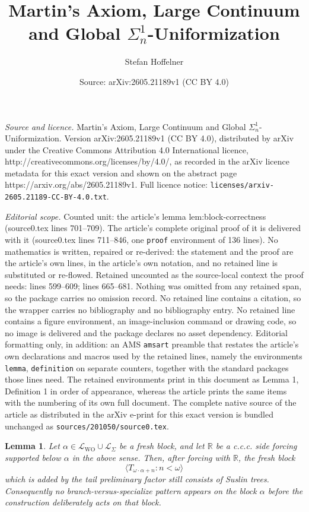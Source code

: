 \documentclass[10pt,a4paper]{amsart}
\title{Martin's Axiom, Large Continuum and Global $\Sigma^1_n$-Uniformization}
\author{Stefan Hoffelner}
\date{Source: arXiv:2605.21189v1 (CC BY 4.0)}
\newtheorem{lemma}{Lemma}
\begin{document}
\maketitle

\noindent\emph{Source and licence.} Martin's Axiom, Large Continuum and Global $\Sigma^1_n$-Uniformization. Version arXiv:2605.21189v1 (CC BY 4.0), distributed by arXiv under the Creative Commons Attribution 4.0 International licence, http://creativecommons.org/licenses/by/4.0/, as recorded in the arXiv licence metadata for this exact version and shown on the abstract page https://arxiv.org/abs/2605.21189v1. Full licence notice: \texttt{licenses/arxiv-2605.21189-CC-BY-4.0.txt}.\par\smallskip

\noindent\textit{Editorial scope.} Counted unit: the article's lemma lem:block-correctness (source0.tex lines 701--709). The article's complete original proof of it is delivered with it (source0.tex lines 711--846, one \texttt{proof} environment of 136 lines). No mathematics is written, repaired or re-derived: the statement and the proof are the article's own lines, in the article's own notation, and no retained line is substituted or re-flowed.  Retained uncounted as the source-local context the proof needs: lines 599--609; lines 665--681.  Nothing was omitted from any retained span, so the package carries no omission record.  No retained line contains a citation, so the wrapper carries no bibliography and no bibliography entry.  No retained line contains a figure environment, an image-inclusion command or drawing code, so no image is delivered and the package declares no asset dependency.  Editorial formatting only, in addition: an AMS \texttt{amsart} preamble that restates the article's own declarations and macros used by the retained lines, namely the environments \texttt{lemma}, \texttt{definition} on separate counters, together with the standard packages those lines need.  The retained environments print in this document as Lemma 1, Definition 1 in order of appearance, whereas the article prints the same items with the numbering of its own full document.  The complete native source of the article as distributed in the arXiv e-print for this exact version is bundled unchanged as \texttt{sources/201050/source0.tex}.
\begin{lemma}\label{lem:no-accidental-codes}
Let \(\alpha\in\mathcal L_{\mathrm{WO}}\cup\mathcal L_\Sigma\) be a fresh block,
and let \(\mathbb R\) be a c.c.c. side forcing supported below \(\alpha\) in the
above sense.  Then, after forcing with \(\mathbb R\), the fresh block
\[
   \langle T_{\omega\cdot\alpha+n}:n<\omega\rangle
\]
which is added by the tail preliminary factor still consists of Suslin trees.
Consequently no branch-versus-specialize pattern appears on the block
\(\alpha\) before the construction deliberately acts on that block.
\end{lemma}
\end{document}
